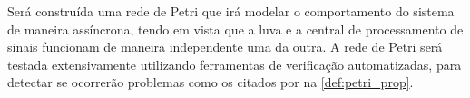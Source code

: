 Será construída uma rede de Petri que irá modelar o comportamento do sistema de maneira assíncrona, tendo em vista que a luva e a central de processamento de sinais funcionam de maneira independente uma da outra. A rede de Petri será testada extensivamente utilizando ferramentas de verificação automatizadas, para detectar se ocorrerão problemas como os citados por  na \autoref{def:petri_prop}.


